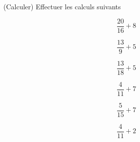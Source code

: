  (Calculer) Effectuer les calculs suivants

\begin{multicols}{6}
$$\dfrac{20}{16}+8$$

$$\dfrac{13}{9}+5$$

$$\dfrac{13}{18}+5$$

$$\dfrac{4}{11}+7$$

$$\dfrac{5}{15}+7$$

$$\dfrac{4}{11}+2$$

\end{multicols}